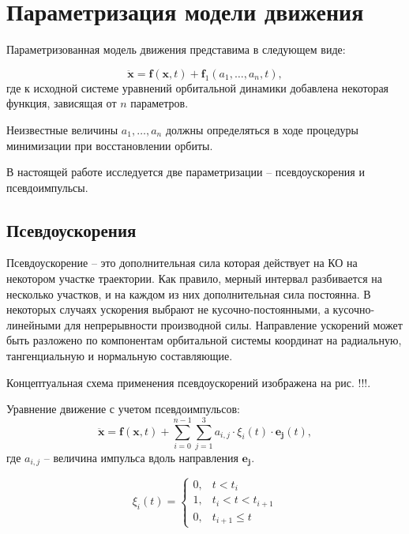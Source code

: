 \section{Параметризация модели движения}
\label{sec:Chapter2} 

Параметризованная модель движения представима в следующем виде:

\begin{equation*}
    \ddot{\mathbf{x}} = \mathbf{f}(\mathbf{x}, t) +
    \mathbf{f}_1(a_1, \dots, a_n, t),
\end{equation*}
где к исходной системе уравнений орбитальной динамики добавлена
некоторая функция, зависящая от $n$ параметров.

Неизвестные величины $a_1, \dots, a_n$ должны определяться в ходе процедуры минимизации при
восстановлении орбиты.

В настоящей работе исследуется две параметризации -- псевдоускорения и псевдоимпульсы.

\subsection{Псевдоускорения}

Псевдоускорение -- это дополнительная сила которая действует на КО на некотором участке 
траектории. Как правило, мерный интервал разбивается на несколько участков, и на каждом
из них дополнительная сила постоянна. В некоторых случаях ускорения выбрают не
кусочно-постоянными, а кусочно-линейными для непрерывности производной силы.
Направление ускорений может быть разложено по компонентам орбитальной системы координат на радиальную, тангенциальную и нормальную
составляющие. 

Концептуальная схема применения псевдоускорений изображена на рис. !!!.

Уравнение движение с учетом псевдоимпульсов:
\begin{equation*}
    \ddot{\mathbf{x}} = \mathbf{f}(\mathbf{x}, t) +
        \sum_{i=0}^{n-1} \sum_{j=1}^{3} a_{i,j} \cdot \xi_{i}(t) \cdot \mathbf{e_j} (t),
\end{equation*}
где $a_{i,j}$ -- величина импульса вдоль направления $\mathbf{e_j}$.

\begin{equation*}
    \xi_{i}(t) = 
            \begin{cases}
                0, & t < t_i \\
                1, & t_i < t < t_{i+1} \\
                0, & t_{i+1} \le t
            \end{cases}
\end{equation*}

